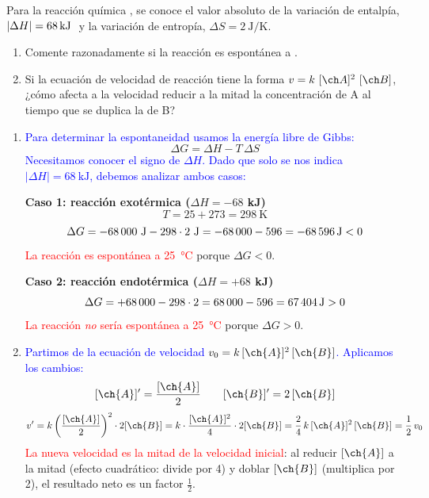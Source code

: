 \begin{exerciseEVAU}
\begin{solu}
    \end{solu}
\end{exerciseEVAU}


\begin{exerciseEVAU}
    Para la reacción química , se conoce el valor absoluto de la variación de entalpía, \(|\Delta H| = \energia[kj]{68}\) y la variación de entropía, \(\Delta S = \SI{2}{\joule\per\kelvin}\).
    \begin{enumerate}[label=\letraminuscula]
        \item Comente razonadamente si la reacción es espontánea a .
        \item Si la ecuación de velocidad de reacción tiene la forma \(v = k\ \conc{A}^2\ \conc{B}\), ¿cómo afecta a la velocidad reducir a la mitad la concentración de A al tiempo que se duplica la de B?
    \end{enumerate}

    \begin{solu}

    \begin{enumerate}[label=\letraminuscula]
        \item \textcolor{blue}{Para determinar la espontaneidad usamos la energía libre de Gibbs:}
        \[
            \boxed{\Delta G = \Delta H - T\,\Delta S}
        \]
        \textcolor{blue}{Necesitamos conocer el signo de \(\Delta H\). Dado que solo se nos indica \(|\Delta H| = \qty{68}{\kJ}\), debemos analizar ambos casos:}

        \textbf{Caso 1: reacción exotérmica (\(\Delta H = -68\) kJ)}
        \[
            T = 25 + 273 = \qty{298}{\K}
        \]
        \[
            \Delta G = -68\,000\ \unit{\J} - 298\cdot 2\ \unit{\J} = -68\,000 - 596 = \qty{-68\,596}{\J} < 0
        \]
        \textcolor{red}{La reacción es espontánea a \qty{25}{\celsius}} porque \(\Delta G < 0\).

        \textbf{Caso 2: reacción endotérmica (\(\Delta H = +68\) kJ)}
        \[
            \Delta G = +68\,000 - 298\cdot2 = 68\,000 - 596 = \qty{+67\,404}{\J} > 0
        \]
        \textcolor{red}{La reacción \emph{no} sería espontánea a \qty{25}{\celsius}} porque \(\Delta G > 0\).

        \item \textcolor{blue}{Partimos de la ecuación de velocidad \(v_0 = k\,[\ch{A}]^2\,[\ch{B}]\). Aplicamos los cambios:}
        \[
            [\ch{A}]' = \frac{[\ch{A}]}{2} \qquad [\ch{B}]' = 2\,[\ch{B}]
        \]
        \[
            v' = k\left(\frac{[\ch{A}]}{2}\right)^2\cdot 2[\ch{B}] = k\cdot\frac{[\ch{A}]^2}{4}\cdot 2[\ch{B}] = \frac{2}{4}\,k\,[\ch{A}]^2\,[\ch{B}] = \frac{1}{2}\,v_0
        \]
        \textcolor{red}{La nueva velocidad es la mitad de la velocidad inicial}: al reducir \([\ch{A}]\) a la mitad (efecto cuadrático: divide por 4) y doblar \([\ch{B}]\) (multiplica por 2), el resultado neto es un factor \(\tfrac{1}{2}\).
    \end{enumerate}


\end{solu}
\end{exerciseEVAU}
